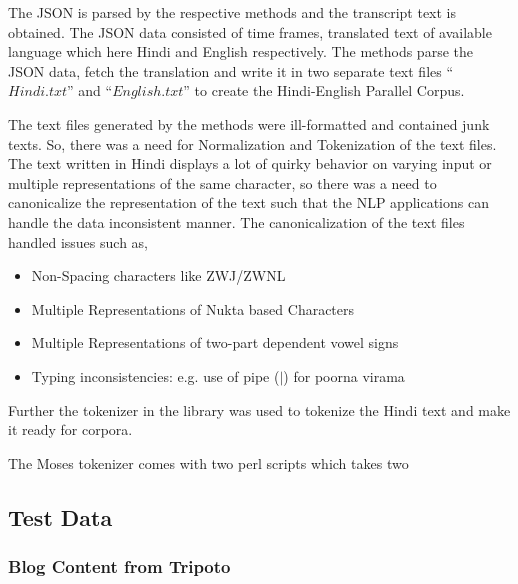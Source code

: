 The JSON is parsed by the respective methods and the transcript text is obtained. The JSON data consisted of time frames, translated text of available language which here Hindi and English respectively. The methods parse the JSON data, fetch the translation and write it in two separate text files “$Hindi.txt$” and “$English.txt$” to create the Hindi-English Parallel Corpus.

The text files generated by the methods were ill-formatted and contained junk texts. So, there was a need for Normalization and Tokenization of the text files. The text written in Hindi displays a lot of quirky behavior on varying input or multiple representations of the same character, so there was a need to canonicalize the representation of the text such that the NLP applications can handle the data inconsistent manner. The canonicalization of the text files handled issues such as,
\begin{itemize}
\item Non-Spacing characters like ZWJ/ZWNL
\item Multiple Representations of Nukta based Characters
\item Multiple Representations of two-part dependent vowel signs
\item Typing inconsistencies: e.g. use of pipe ($|$) for poorna virama 
\end{itemize}

Further the tokenizer in the library was used to tokenize the Hindi text and make it ready for corpora.

The Moses tokenizer comes with two perl scripts which takes two

\subsection{Test Data}
\subsubsection{Blog Content from Tripoto}
